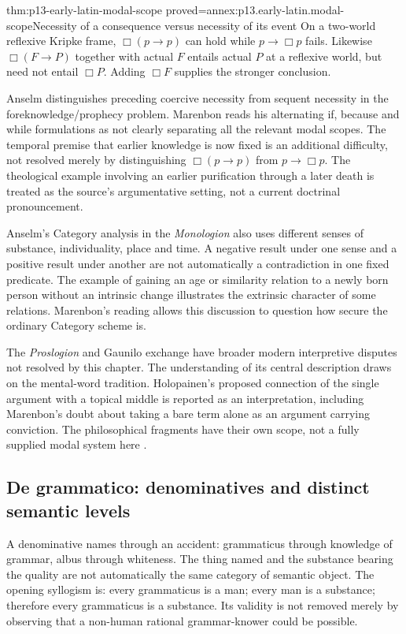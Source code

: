 \begin{hblemma}{thm:p13-early-latin-modal-scope}
 {proved=annex:p13.early-latin.modal-scope}{Necessity of a consequence versus necessity of its event}
On a two-world reflexive Kripke frame, \(\Box(p\to p)\) can hold
while \(p\to\Box p\) fails.
Likewise \(\Box(F\to P)\) together with actual \(F\) entails actual
\(P\) at a reflexive world, but need not entail \(\Box P\).
Adding \(\Box F\) supplies the stronger conclusion.
\end{hblemma}

Anselm distinguishes preceding coercive necessity from sequent
necessity in the foreknowledge/prophecy problem.
Marenbon reads his alternating if, because and while formulations
as not clearly separating all the relevant modal scopes.
The temporal premise that earlier knowledge is now fixed is an
additional difficulty, not resolved merely by distinguishing
\(\Box(p\to p)\) from \(p\to\Box p\).
The theological example involving an earlier purification through
a later death is treated as the source's argumentative setting,
not a current doctrinal pronouncement.

Anselm's Category analysis in the \emph{Monologion} also uses different
senses of substance, individuality, place and time. A negative
result under one sense and a positive result under another are
not automatically a contradiction in one fixed predicate.
The example of gaining an age or similarity relation to a newly
born person without an intrinsic change illustrates the extrinsic
character of some relations.
Marenbon's reading allows this discussion to question how secure
the ordinary Category scheme is.

The \emph{Proslogion} and Gaunilo exchange have broader modern
interpretive disputes not resolved by this chapter.
The understanding of its central description draws on the
mental-word tradition. Holopainen's proposed connection of the
single argument with a topical middle is reported as an interpretation,
including Marenbon's doubt about taking a bare term alone as an
argument carrying conviction. The philosophical fragments have
their own scope, not a fully supplied modal system here
\cite[pp.~45--51]{Marenbon2007FordhamEarlyLatin}.

\subsection{De grammatico: denominatives and distinct semantic levels}

A denominative names through an accident: grammaticus through
knowledge of grammar, albus through whiteness. The thing named
and the substance bearing the quality are not automatically
the same category of semantic object.
The opening syllogism is:
every grammaticus is a man; every man is a substance;
therefore every grammaticus is a substance.
Its validity is not removed merely by observing that a
non-human rational grammar-knower could be possible.

